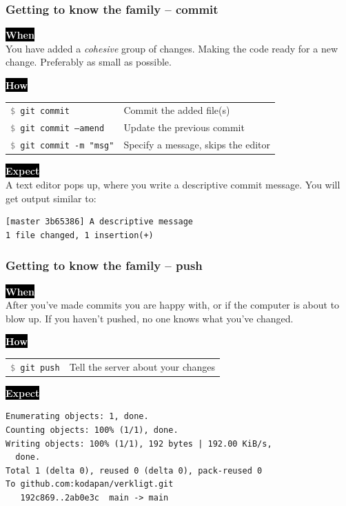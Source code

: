 \documentclass{beamer}
\newcommand{\keyword}[1]{\hspace{-1.0em}\colorbox{black}{\textcolor{white}{\textbf{#1}\vphantom{Ep}}}\vspace{0.2em}} %
\newcommand{\command}[1]{\texttt{\textcolor{gray}{\$} {#1}}}
\begin{document}
\begin{frame}[fragile]
  \frametitle{Getting to know the family -- commit}
  \keyword{When}\\
    You have added a \emph{cohesive} group of changes. Making
    the code ready for a new change. Preferably as small as possible.
  \vspace{0.5em}

  \keyword{How}\\
  \hspace{-0.95em}
  \begin{tabular}{ll}
    \command{git commit} & Commit the added file(s) \\
    \command{git commit --amend} & Update the previous commit \\
    \command{git commit -m "msg"} & Specify a message, skips the editor \\
  \end{tabular}
  \vspace{0.5em}

  \keyword{Expect}\\
  A text editor pops up, where you write a descriptive commit message. You will get
  output similar to: \\
\begin{verbatim}
[master 3b65386] A descriptive message
1 file changed, 1 insertion(+)
\end{verbatim}

\end{frame}

\begin{frame}[fragile]
  \frametitle{Getting to know the family -- push}
  \keyword{When}\\
    After you've made commits you are happy with, or if the computer
    is about to blow up. If you haven't pushed, no one knows what
    you've changed. \\
  \vspace{0.5em}

  \keyword{How}\\
  \hspace{-0.95em}
  \begin{tabular}{ll}
    \command{git push} & Tell the server about your changes \\
  \end{tabular}
  \vspace{0.5em}

  \keyword{Expect}\\ [0.1em]
\begin{verbatim}
Enumerating objects: 1, done.
Counting objects: 100% (1/1), done.
Writing objects: 100% (1/1), 192 bytes | 192.00 KiB/s,
  done.
Total 1 (delta 0), reused 0 (delta 0), pack-reused 0
To github.com:kodapan/verkligt.git
   192c869..2ab0e3c  main -> main
\end{verbatim}
\end{frame}
\end{document}
